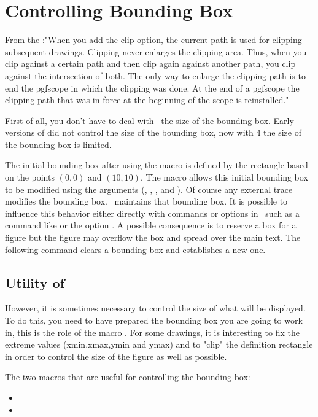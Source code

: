 \section{Controlling Bounding Box}
From the  :"When you add the clip option, the current path is used for clipping subsequent drawings. Clipping never enlarges the clipping area. Thus, when you clip against a certain path and then clip again against another path, you clip against the intersection of both.
The only way to enlarge the clipping path is to end the {pgfscope} in which the clipping was done. At the end of a {pgfscope} the clipping path that was in force at the beginning of the scope is reinstalled."


First of all, you don't have to deal with \TIKZ\ the size of the bounding box. Early versions of  did not control the size of the bounding box, now with \tkzNamePack{\tkznameofpack} 4 the size of the bounding box is limited.

The initial bounding box after using the macro  is defined by the rectangle based on the points $(0,0)$ and $(10,10)$. The  macro allows this initial bounding box to be modified using the arguments (, , , and ). Of course any external trace modifies the bounding box. \TIKZ\ maintains that bounding box. It is possible to influence this behavior either directly with commands or options in \TIKZ\ such as a command like  or the option . A possible consequence is to reserve a box for a figure but the figure may overflow the box and spread over the main text.
The following command  clears a bounding box and establishes a new one.

\subsection{Utility of } 
 However, it is sometimes necessary to control the size of what will be displayed.
 To do this, you need to have prepared the bounding box you are going to work in, this is the role of the   macro .  For some drawings, it is interesting to fix the extreme values (xmin,xmax,ymin and ymax) and to "clip" the definition rectangle in order to control the size of the figure as well as possible.

The two macros that are useful for controlling the bounding box:
\begin{itemize}
   \item {}
   \item {}
\end{itemize}
\vspace{20pt}

